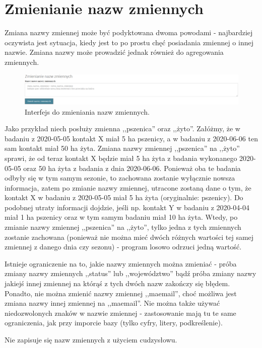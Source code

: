\documentclass[12pt, twoside, hidelinks]{report}
\begin{document}
\section{Zmienianie nazw zmiennych}
Zmiana nazwy zmiennej może być podyktowana dwoma powodami - najbardziej oczywista jest sytuacja, kiedy jest to po prostu chęć posiadania zmiennej o innej nazwie. Zmiana nazwy może prowadzić jednak również do agregowania zmiennych. \par
\begin{figure}[h!]
\includegraphics[width = 1\textwidth]{3.2.}
\caption{Interfejs do zmieniania nazw zmiennych.}
\label{zmienianie_nazw_zmiennych_interfejs}
\end{figure}
Jako przykład niech posłuży zmienna ,,pszenica'' oraz ,,żyto''. Załóżmy, że w badaniu z 2020-05-05 kontakt X miał 5 ha pszenicy, a w badaniu z 2020-06-06 ten sam kontakt miał 50 ha żyta. Zmiana nazwy zmiennej ,,pszenica'' na ,,żyto'' sprawi, że od teraz kontakt X będzie miał 5 ha żyta z badania wykonanego 2020-05-05 oraz 50 ha żyta z badania z dnia 2020-06-06. Ponieważ oba te badania odbyły się w tym samym sezonie, to zachowana zostanie wyłącznie nowsza informacja, zatem po zmianie nazwy zmiennej, utracone zostaną dane o tym, że kontakt X w badaniu z 2020-05-05 miał 5 ha żyta (oryginalnie: pszenicy). Do podobnej utraty informacji dojdzie, jeśli np. kontakt Y w badaniu z 2020-04-04 miał 1 ha pszenicy oraz w tym samym badaniu miał 10 ha żyta. Wtedy, po zmianie nazwy zmiennej ,,pszenica'' na ,,żyto'', tylko jedna z tych zmiennych zostanie zachowana (ponieważ nie można mieć dwóch różnych wartości tej samej zmiennej z danego dnia czy sezonu) - program losowo odrzuci jedną wartość. \par
Istnieje ograniczenie na to, jakie nazwy zmiennych można zmieniać - próba zmiany nazwy zmiennych ,,status'' lub ,,województwo'' bądź próba zmiany nazwy jakiejś innej zmiennej na którąś z tych dwóch nazw zakończy się błędem. Ponadto, nie można zmienić nazwy zmiennej ,,ma\textunderscore email'', choć możliwa jest zmiana nazwy innej zmiennej na ,,ma\textunderscore email''. Nie można także używać niedozwolonych znaków w nazwie zmiennej - zastosowanie mają tu te same ograniczenia, jak przy imporcie bazy (tylko cyfry, litery, podkreślenie). \par
Nie zapisuje się nazw zmiennych z użyciem cudzysłowu.
\end{document}
